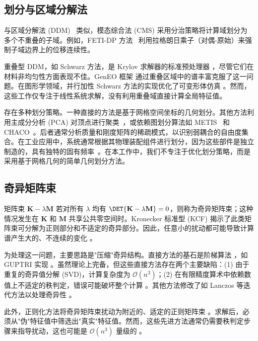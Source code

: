 \subsection{划分与区域分解法}

与区域分解法 (DDM)~\cite{Smith1997DDM} 类似，模态综合法 (CMS) 采用分治策略将计算域划分为多个不重叠的子域。例如，FETI-DP 方法~\cite{Farhat2001FETIDP} 利用拉格朗日乘子（对偶-原始）来强制子域边界上的位移连续性。

重叠型 DDM，如 Schwarz 方法，是 Krylov 求解器的标准预处理器 \cite{M2AN_2005__39_4_693_0, Marco2024Overlap}，尽管它们在材料非均匀性方面表现不佳。GenEO 框架 \cite{NicoleSpillaneSolve2013,Ryadh2015Schwarz,Spillane2025GenEO} 通过重叠区域中的谱丰富克服了这一问题。在图形学领域，并行加性 Schwarz 方法的实现优化了可变形体仿真 \cite{Wu:2022:GBM}。然而，这些工作仅专注于线性系统求解，没有利用重叠域直接计算全局特征值。

存在多种划分策略。一种直接的方法是基于网格空间坐标的几何划分。其他方法利用主成分分析 (PCA) 对顶点进行聚类~\cite{HUANG2006927}，或依赖图划分算法如 METIS~\cite{Karypis1995graph, Karypis1997METIS} 和 CHACO~\cite{Hendrickson2011}。后者通常分析质量和刚度矩阵的稀疏模式，以识别弱耦合的自由度集合。在工业应用中，系统通常根据其物理装配组件进行划分，因为这些部件是独立制造的，具有独特的固有频率~\cite{Vysok2017CurrentCO}。在本工作中，我们不专注于优化划分策略，而是采用基于网格几何的简单几何划分方法。

\subsection{奇异矩阵束}\label{sec:singluar-matrix-pencil}

矩阵束 $\mathbf{K} - \lambda \mathbf{M}$ 若对所有 $\lambda$ 均有 $\DET{\mathbf{K} - \lambda \mathbf{M}} = 0$，则称为奇异矩阵束；这种情况发生在 $\mathbf{K}$ 和 $\mathbf{M}$ 共享公共零空间时。Kronecker 标准型 (KCF) \cite{gantmakher2000theory, Van1979Kronecker, Berger2012QuasiKroneckerFrom} 揭示了此类矩阵束可分解为正则部分和不适定的奇异部分。因此，任意小的扰动都可能导致计算谱产生大的、不连续的变化 \cite{Hochstenbach2019SolvingSingular, Kressner2024AnalysisOfeigenvalue}。

为处理这一问题，主要思路是"压缩"奇异结构。直接方法的基石是阶梯算法 \cite{Demmel1993TheGS, Van1979Kronecker}，如 GUPTRI 实现 \cite{Demmel1993TheGS}。虽然理论上完备，但这些直接方法存在两个主要缺陷：(1) 由于重复的奇异值分解 (SVD)，计算复杂度为 $\mathcal{O}(n^3)$；(2) 在有限精度算术中依赖数值上不适定的秩判定，错误可能破坏整个计算 \cite{Edelman2000StaircaseFailures}。其他方法修改了如 Lanczos 等迭代方法以处理奇异性 \cite{Lin2021ShiftInvertLanczos, karl2024ShiftInvertArnoldi}。

此外，正则化方法将奇异矩阵束扰动为附近的、适定的正则矩阵束 \cite{Fernando2008FirstOrder, Hochstenbach2019SolvingSingular}。求解后，必须从"伪"特征值中筛选出"真实"特征值。然而，这些先进方法通常仍需要秩判定步骤来指导扰动，这也可能是 $\mathcal{O}(n^3)$ 量级的 \cite{Hochstenbach2019SolvingSingular, karl2024ShiftInvertArnoldi}。
